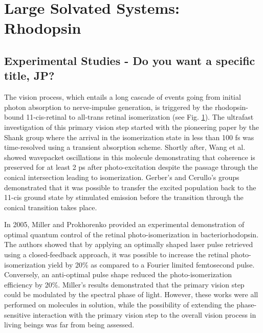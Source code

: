 \documentclass[journal=jacsat,manuscript=article]{achemso}
\begin{document}
\section{Large Solvated Systems: Rhodopsin}

\subsection{Experimental Studies - Do you want a specific title, JP?}
The vision process, which entails a long cascade of events going from
initial photon absorption to nerve-impulse generation, is triggered by
the rhodopsin-bound 11-cis-retinal to all-trans retinal isomerization
(see Fig. \ref{fig:wolf1}). The ultrafast investigation of this
primary vision step started with the pioneering paper by the Shank
group where the arrival in the isomerization state in less than 100 fs
was time-resolved using a transient absorption
scheme.\cite{schonlein:1991} Shortly after, Wang et al. showed
wavepacket oscillations in this molecule demonstrating that coherence
is preserved for at least 2 ps after photo-excitation despite the
passage through the conical intersection leading to
isomerization.\cite{wang:1994} Gerber’s and Cerullo’s groups
demonstrated that it was possible to transfer the excited population
back to the 11-cis ground state by stimulated emission before the
transition through the conical transition takes
place.\cite{polli:2010,gerber:2006}\\



\begin{figure}[h]
\caption{}
\label{fig:wolf1}
\end{figure}


In 2005, Miller and Prokhorenko provided an experimental demonstration
of optimal quantum control of the retinal photo-isomerization in
bacteriorhodopsin.\cite{miller:2005} The authors showed that by
applying an optimally shaped laser pulse retrieved using a
closed-feedback approach, it was possible to increase the retinal
photo-isomerization yield by 20\% as compared to a Fourier limited
femtosecond pulse. Conversely, an anti-optimal pulse shape reduced the
photo-isomerization efficiency by 20\%. Miller’s results demonstrated
that the primary vision step could be modulated by the spectral phase
of light. However, these works were all performed on molecules in
solution, while the possibility of extending the phase-sensitive
interaction with the primary vision step to the overall vision process
in living beings was far from being assessed.
\end{document}
